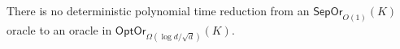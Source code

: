\documentclass[11pt,letterpaper]{article}
\newcommand{\sht}{{\mathsf {SHT}}\xspace}
\newcommand{\sep}{{\mathsf{SepOr}}}
\newcommand{\opto}{{\mathsf{OptOr}}}
\begin{document}
\begin{theorem}\label{thm-sep-opt-lower}
There is no deterministic polynomial time reduction from an  $\sep_{O(1)}(K)$ oracle to an oracle in $\opto_{\Omega(\log d/\sqrt{d})}(K).$ 
\end{theorem}



\end{document}
